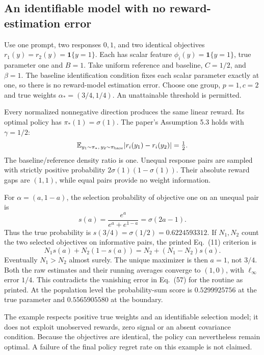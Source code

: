 \documentclass[10pt]{article}
\begin{document}
\subsection*{An identifiable model with no reward-estimation error}
Use one prompt, two responses \(0,1\), and two identical objectives \(r_1(y)=r_2(y)=\mathbf1\{y=1\}\). Each has scalar feature \(\phi_i(y)=\mathbf1\{y=1\}\), true parameter one and \(B=1\). Take uniform reference and baseline, \(C=1/2\), and \(\beta=1\). The baseline identification condition fixes each scalar parameter exactly at one, so there is no reward-model estimation error. Choose one group, \(p=1,c=2\) and true weights \(\alpha_*=(3/4,1/4)\). An unattainable threshold is permitted.\par
Every normalized nonnegative direction produces the same linear reward. Its optimal policy has \(\pi_*(1)=\sigma(1)\). The paper’s Assumption 5.3 holds with \(\gamma=1/2\): \[\mathbb E_{y_1\sim\pi_*,\,y_2\sim\pi_{\rm base}}
 |r_i(y_1)-r_i(y_2)|=\tfrac12.\] The baseline/reference density ratio is one. Unequal response pairs are sampled with strictly positive probability \(2\sigma(1)(1-\sigma(1))\). Their absolute reward gaps are \((1,1)\), while equal pairs provide no weight information.\par
For \(\alpha=(a,1-a)\), the selection probability of objective one on an unequal pair is \[s(a)=\frac{e^a}{e^a+e^{1-a}}=\sigma(2a-1).\] Thus the true probability is \(s(3/4)=\sigma(1/2)=0.6224593312\). If \(N_1,N_2\) count the two selected objectives on informative pairs, the printed Eq. (11) criterion is \[N_1s(a)+N_2(1-s(a))
 =N_2+(N_1-N_2)s(a).\] Eventually \(N_1>N_2\) almost surely. The unique maximizer is then \(a=1\), not \(3/4\). Both the raw estimates and their running averages converge to \((1,0)\), with \(\ell_\infty\) error \(1/4\). This contradicts the vanishing error in Eq. (57) for the routine as printed. At the population level the probability-sum score is \(0.5299925756\) at the true parameter and \(0.5565905580\) at the boundary.\par
The example respects positive true weights and an identifiable selection model; it does not exploit unobserved rewards, zero signal or an absent covariance condition. Because the objectives are identical, the policy can nevertheless remain optimal. A failure of the final policy regret rate on this example is not claimed.\par
\end{document}
